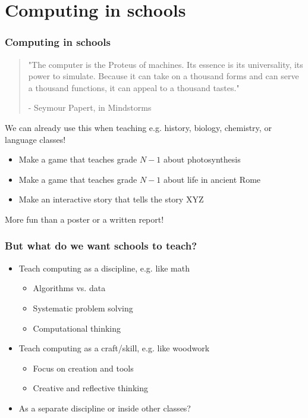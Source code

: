 \documentclass{beamer}
\begin{document}
\section{Computing in schools}
\begin{frame}
  \frametitle{Computing in schools}
  \begin{quotation}
    "The computer is the Proteus of machines. Its essence is its
    universality, its power to simulate. Because it can take on a
    thousand forms and can serve a thousand functions, it can appeal
    to a thousand tastes."

    - Seymour Papert, in Mindstorms
  \end{quotation}

  We can already use this when teaching e.g. history, biology, chemistry,
  or language classes!

  \begin{itemize}
  \item Make a game that teaches grade $N-1$ about photosynthesis
  \item Make a game that teaches grade $N-1$ about life in ancient Rome
  \item Make an interactive story that tells the story XYZ
  \end{itemize}

  More fun than a poster or a written report!
\end{frame}

\begin{frame}
  \frametitle{But what do we want schools to teach?}

  \begin{itemize}
  \item Teach computing as a discipline, e.g. like math
    \begin{itemize}
    \item Algorithms vs. data
    \item Systematic problem solving
    \item Computational thinking
    \end{itemize}
  \item Teach computing as a craft/skill, e.g. like woodwork
    \begin{itemize}
    \item Focus on creation and tools
    \item Creative and reflective thinking
    \end{itemize}
  \item As a separate discipline or inside other classes?
  \end{itemize}
\end{frame}
\end{document}

